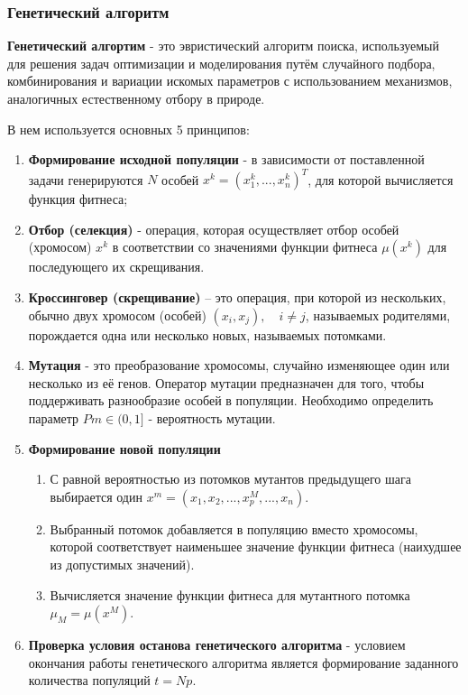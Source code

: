 \documentclass[a4paper, 12pt]{article}   	%
\begin{document}
    \subsubsection{Генетический алгоритм}
    \textbf{Генетический алгортим} - это эвристический алгоритм поиска, используемый для решения задач оптимизации и моделирования путём случайного подбора, комбинирования и вариации искомых параметров с использованием механизмов, аналогичных естественному отбору в природе. 
    
    В нем используется основных 5 принципов:
    \begin{enumerate}
        \item \textbf{Формирование исходной популяции} - в зависимости от поставленной задачи генерируются $N$ особей $x^k = (x_1^k,..., x_n^k)^T$, для которой вычисляется функция фитнеса;
        \item \textbf{Отбор (селекция)} - операция, которая осуществляет отбор особей (хромосом) $x^k$ в соответствии со значениями функции фитнеса $\mu(x^k)$ для последующего их скрещивания.
        \item \textbf{Кроссинговер (скрещивание)} – это операция, при которой из нескольких, обычно двух хромосом (особей) $(x_i, x_j), \quad i \neq j$, называемых родителями, порождается одна или несколько новых, называемых потомками.
        \item \textbf{Мутация} - это преобразование хромосомы, случайно изменяющее один или несколько из её генов. Оператор мутации предназначен для того, чтобы поддерживать разнообразие особей в популяции. Необходимо определить параметр $Pm \in (0, 1]$ - вероятность мутации.
        \item \textbf{Формирование новой популяции}
        \begin{enumerate}
            \item С равной вероятностью из потомков мутантов предыдущего шага выбирается один $x^m = (x_1, x_2,..., x_p^M,..., x_n)$. 
            \item Выбранный потомок добавляется в популяцию вместо хромосомы, которой соответствует наименьшее значение функции фитнеса (наихудшее из допустимых значений).
            \item Вычисляется значение функции фитнеса для мутантного потомка $\mu_M = \mu(x^M)$.
        \end{enumerate}
        \item \textbf{Проверка условия останова генетического алгоритма} - условием окончания работы генетического алгоритма является формирование заданного количества популяций $t = Np$.
    \end{enumerate}
    
\end{document}
